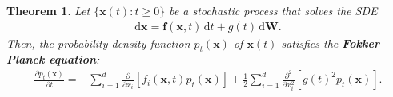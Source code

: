 \documentclass[10pt]{article}
\newtheorem{theorem}[lemma]{Theorem}
\newcommand{\dee}{\mathrm{d}}
\newcommand{\ve}[1]{\mathbf{#1}}
\begin{document}
\begin{itemize}
  \begin{theorem}
    Let $\{ \ve{x}(t) : t \geq 0 \}$ be a stochastic process that solves the SDE
    \begin{align}
      \dee\ve{x} = \ve{f}(\ve{x}, t)\, \dee t + g(t)\, \dee\ve{W}. \label{eqn:diffusion-sde}
    \end{align}
    Then, the probability density function $p_t(\ve{x})$ of $\ve{x}(t)$ satisfies the {\bf Fokker--Planck equation}:
    \begin{align} \label{eqn:fokker-planck}
      \frac{\partial p_t(\ve{x})}{\partial t}
      = - \sum_{i=1}^d \frac{\partial}{\partial x_i}[f_i(\ve{x},t) p_t(\ve{x})] + \frac{1}{2} \sum_{i=1}^d \frac{\partial^2}{\partial x_i^2} [g(t)^2 p_t(\ve{x})].
    \end{align}
  \end{theorem}


\end{itemize}
\end{document}
